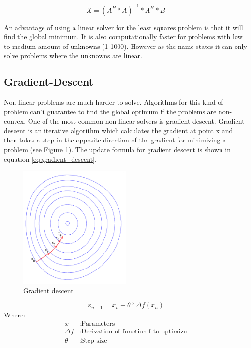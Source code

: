 \documentclass[11pt,a4paper,titlepage,oneside]{report}
\begin{document}
\begin{equation}\label{eq:least_squares_algorithm}
  X=(A^H*A)^{-1}*A^H*B 
\end{equation}

An advantage of using a linear solver for the least squares problem is that it will find the global minimum. It is also computationally faster for problems with low to medium amount of unknowns (1-1000). However as the name states it can only solve problems where the unknowns are linear.

\subsection{Gradient-Descent}
Non-linear problems are much harder to solve. Algorithms for this kind of problem can't guarantee to find the global optimum if the problems are non-convex. One of the most common non-linear solvers is gradient descent. Gradient descent is an iterative algorithm which calculates the gradient at point x and then takes a step in the opposite direction of the gradient for minimizing a problem (see Figure \ref{fig:gradient_descent}). The update formula for gradient descent is shown in equation \ref{eq:gradient_descent}.
\begin{figure}[H]
  \begin{center}
    \includegraphics[width=0.5\textwidth]{img/gradient_descent.png}
  \end{center}
    \caption{Gradient descent}\label{fig:gradient_descent}
\end{figure}

\begin{equation}\label{eq:gradient_descent}
  x_{n+1}=x_n-\theta*\Delta f(x_n)
\end{equation}
Where:
\begin{align*}
  x		      &: \text{Parameters}\\
  \Delta f  &: \text{Derivation of function f to optimize}\\
  \theta    &: \text{Step size}
\end{align*}
\end{document}

